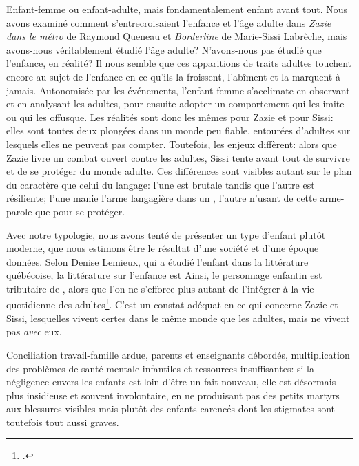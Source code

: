 Enfant-femme ou enfant-adulte, mais fondamentalement enfant avant tout.
Nous avons examiné comment s'entrecroisaient l'enfance et l'âge adulte dans \textit{Zazie dans le métro} de Raymond Queneau et \textit{Borderline} de Marie-Sissi Labrèche, mais avons-nous véritablement étudié l'âge adulte?
N'avons-nous pas étudié que l'enfance, en réalité?
Il nous semble que ces apparitions de traits adultes touchent encore au sujet de l'enfance en ce qu'ils la froissent, l'abîment et la marquent à jamais.
Autonomisée par les événements, l'enfant-femme s'acclimate en observant et en analysant les adultes, pour ensuite adopter un comportement qui les imite ou qui les offusque.
Les réalités sont donc les mêmes pour Zazie et pour Sissi: elles sont toutes deux plongées dans un monde peu fiable, entourées d'adultes sur lesquels elles ne peuvent pas compter.
Toutefois, les enjeux diffèrent: alors que Zazie livre un combat ouvert contre les adultes, Sissi tente avant tout de survivre et de se protéger du monde adulte.
Ces différences sont visibles autant sur le plan du caractère que celui du langage: l'une est brutale tandis que l'autre est résiliente; l'une manie l'arme langagière dans un , l'autre n'usant de cette arme-parole que pour se protéger.
\par
Avec notre typologie, nous avons tenté de présenter un type d'enfant plutôt moderne, que nous estimons être le résultat d'une société et d'une époque données.
Selon Denise Lemieux, qui a étudié l'enfant dans la littérature québécoise, la littérature sur l'enfance est 
Ainsi, le personnage enfantin est tributaire de , alors que l'on ne s'efforce plus autant de l'intégrer à la vie quotidienne des adultes\footcite[9]{Lemieux1984}.
C'est un constat adéquat en ce qui concerne Zazie et Sissi, lesquelles vivent certes dans le même monde que les adultes, mais ne vivent pas \textit{avec} eux.
\par
Conciliation travail-famille ardue, parents et enseignants débordés, multiplication des problèmes de santé mentale infantiles et ressources insuffisantes: si la négligence envers les enfants est loin d'être un fait nouveau, elle est désormais plus insidieuse et souvent involontaire, en ne produisant pas des petits martyrs aux blessures visibles mais plutôt des enfants carencés dont les stigmates sont toutefois tout aussi graves.
